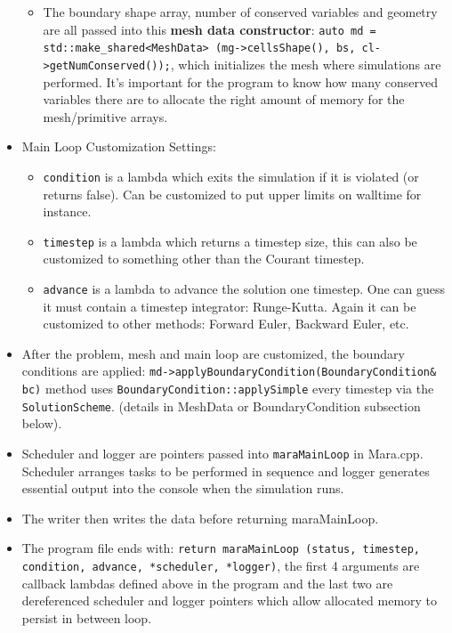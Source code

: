 \documentclass{article}
\begin{document}
\begin{itemize}
\begin{itemize}
		\item The boundary shape array, number of conserved variables and geometry are all passed into this \textbf{mesh data constructor}: \texttt{auto md = std::make\_shared<MeshData> (mg->cellsShape(), bs, cl->getNumConserved());}, which initializes the mesh where simulations are performed. It's important for the program to know how many conserved variables there are to allocate the right amount of memory for the mesh/primitive arrays.
		
	\end{itemize}
	
	\item Main Loop Customization Settings:
	\begin{itemize}
		\item \texttt{condition} is a lambda which exits the simulation if it is violated (or returns false). Can be customized to put upper limits on walltime for instance.
		\item \texttt{timestep} is a lambda which returns a timestep size, this can also be customized to something other than the Courant timestep.
		\item \texttt{advance} is a lambda to advance the solution one timestep. One can guess it must contain a timestep integrator: Runge-Kutta. Again it can be customized to other methods: Forward Euler, Backward Euler, etc. 		
	\end{itemize}		
	
	\item After the problem, mesh and main loop are customized, the boundary conditions are applied: \texttt{md->applyBoundaryCondition(BoundaryCondition\& bc)} method uses  \texttt{BoundaryCondition::applySimple} every timestep via the \texttt{SolutionScheme}. (details in MeshData or BoundaryCondition subsection below). 
	
	\item Scheduler and logger are pointers passed into \texttt{maraMainLoop} in Mara.cpp. Scheduler arranges tasks to be performed in sequence and logger generates essential output into the console when the simulation runs. 
	
	\item The writer then writes the data before returning maraMainLoop.
		
	\item The program file ends with: \texttt{return maraMainLoop (status, timestep, condition, advance, *scheduler, *logger)}, the first 4 arguments are callback lambdas defined above in the program and the last two are dereferenced scheduler and logger pointers which allow allocated memory to persist in between loop.
	

\end{itemize}
\end{document}
